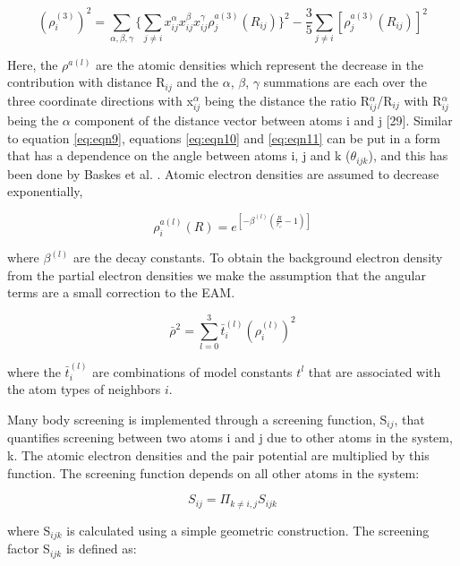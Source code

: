 \documentclass[review]{elsarticle}
\begin{document}
\begin{equation}
\label{eq:eqn11}
(\rho_{i}^{(3)})^{2}=\sum_{\alpha,\beta,\gamma}\{ \sum_{j \neq i}x_{ij}^{\alpha}x_{ij}^{\beta}x_{ij}^{\gamma}\rho_{j}^{a(3)}(R_{ij}) \}^{2} - \frac{3}{5}\sum_{j \neq i}[\rho_{j}^{a(3)}(R_{ij})]^2
\end{equation}

Here, the $\rho^{a(l)}$  are the atomic densities which represent the decrease in the contribution with distance R$_{ij}$ and the $\alpha$, $\beta$, $\gamma$ summations are each over the three coordinate directions with x$_{ij}^{\alpha}$ being the distance the ratio R$_{ij}^{\alpha}$/R$_{ij}$ with R$_{ij}^{\alpha}$ being the $\alpha$ component of the distance vector between atoms i and j [29].  Similar to equation \ref{eq:eqn9}, equations \ref{eq:eqn10} and \ref{eq:eqn11} can be put in a form that has a dependence on the angle between atoms i, j and k ($\theta_{ijk}$), and this has been done by Baskes et al. \cite{baskes1989}.  Atomic electron densities are assumed to decrease exponentially, 

\begin{equation}
\label{eq:eqn12}
\rho_{i}^{a(l)}(R) = e^{[-\beta^{(l)}(\frac{R}{r_{e}}-1)]}
\end{equation}

where $\beta^{(l)}$ are the decay constants.  To obtain the background electron density from the partial electron densities we make the assumption that the angular terms are a small correction to the EAM.

\begin{equation}
\label{eq:eqn13}
\bar{\rho}^{2} = \sum_{l=0}^{3}\bar{t}_{i}^{(l)} (\rho_{i}^{(l)})^{2}
\end{equation}

where the $\bar{t}_{i}^{(l)}$ \cite{valone2006} are combinations of model constants $t^{l}$ that are associated with the atom types of neighbors $i$.

Many body screening is implemented through a screening function, S$_{ij}$, that quantifies screening between two atoms i and j due to other atoms in the system, k.  The atomic electron densities and the pair potential are multiplied by this function.  The screening function depends on all other atoms in the system:

\begin{equation}
\label{eq:eqn14}
S_{ij}=\Pi_{k \neq i,j}S_{ijk}
\end{equation}

where S$_{ijk}$ is calculated using a simple geometric construction.  The screening factor S$_{ijk}$ is defined as:
\end{document}

